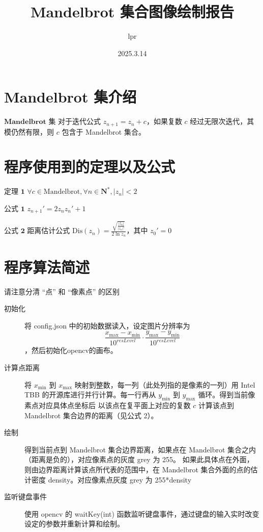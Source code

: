 \documentclass{article}
\title{Mandelbrot 集合图像绘制报告}
\author{lpr}
\date{2025.3.14}
\begin{document}
\maketitle

\section{Mandelbrot 集介绍}

$\textbf{Mandelbrot 集}$ 对于迭代公式 $z_{n+1} = z_n + c$，如果复数 $c$ 经过无限次迭代，其模仍然有限，则 $c$ 包含于 Mandelbrot 集合。 

\section{程序使用到的定理以及公式}

$\textbf{定理 1}$  $\forall c \in \mathrm{Mandelbrot} ,\forall n \in \mathbf{N^*}, |z_n| < 2$  

$\textbf{公式 1}$  ${z_{n+1}}' = 2z_n{z_n}' + 1$

$\textbf{公式 2 距离估计公式}$  $\mathrm{Dis}(z_n) = \frac{\sqrt{ \frac{|z_n|}{|z_n|'} }}  {2\ln{z_n}}$，其中 $z_0' = 0$

\section{程序算法简述}

{\footnotesize$\textbf{请注意分清 “点” 和 “像素点” 的区别}$}

\begin{description}
    \item[初始化] 将 config.json 中的初始数据读入，设定图片分辨率为 $$\frac{x_{\max} - x_{\min}}{10^{resLevel}} \cdot \frac{y_{\max}-y_{\min}}{10^{resLevel}}$$，然后初始化opencv的画布。
    \item[计算点距离] 将 $x_{\min}$ 到 $x_{\max}$ 映射到整数，每一列（此处列指的是像素的一列）用 Intel TBB 的开源库进行并行计算。每一行再从 $y_{\min}$ 到 $y_{\max}$ 循环。得到当前像素点对应具体点坐标后
                     以该点在复平面上对应的复数 $c$ 计算该点到 Mandelbrot 集合边界的距离（见公式 2）。   
    \item[绘制] 得到当前点到 Mandelbrot 集合边界距离，如果点在 Mandelbrot 集合之内（距离是负的），对应像素点的灰度 grey 为 255。
                如果此具体点在外面，则由边界距离计算该点所代表的范围中，在 Mandelbrot 集合外面的点的估计密度 density。对应像素点灰度 grey 为 255*density
    \item[监听键盘事件] 使用 opencv 的 waitKey(int) 函数监听键盘事件，通过键盘的输入实时改变设定的参数并重新计算和绘制。            
\end{description}
\end{document}
